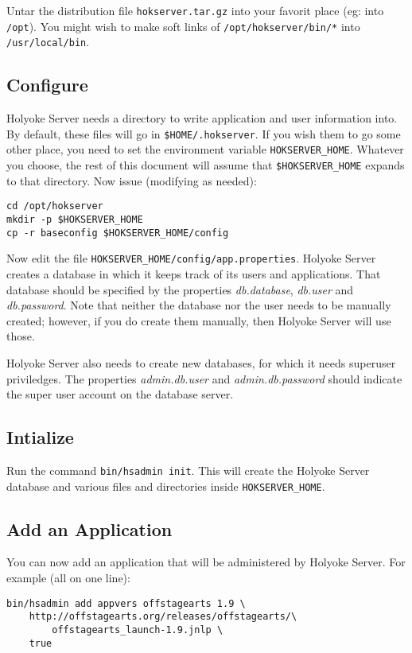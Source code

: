 \documentclass[11pt]{article}
\begin{document}
Untar the distribution file {\tt hokserver.tar.gz} into your favorit place (eg: into {\tt /opt}).  You might wish to make soft links of {\tt /opt/hokserver/bin/*} into {\tt /usr/local/bin}.

\subsection{Configure}

Holyoke Server needs a directory to write application and user information into.  By default, these files will go in {\tt \$HOME/.hokserver}.  If you wish them to go some other place, you need to set the environment variable {\tt HOKSERVER\_HOME}.  Whatever you choose, the rest of this document will assume that {\tt \$HOKSERVER\_HOME} expands to that directory.  Now issue (modifying as needed):
 \begin{verbatim}
cd /opt/hokserver
mkdir -p $HOKSERVER_HOME
cp -r baseconfig $HOKSERVER_HOME/config
 \end{verbatim}

Now edit the file {\tt HOKSERVER\_HOME/config/app.properties}.  Holyoke Server creates a database in which it keeps track of its users and applications.  That database should be specified by the properties \emph{db.database}, \emph{db.user} and \emph{db.password}.  Note that neither the database nor the user needs to be manually created; however, if you do create them manually, then Holyoke Server will use those.

Holyoke Server also needs to create new databases, for which it needs superuser priviledges.  The properties \emph{admin.db.user} and \emph{admin.db.password} should indicate the super user account on the database server.

\subsection{Intialize}

Run the command {\tt bin/hsadmin init}.  This will create the Holyoke Server database and various files and directories inside {\tt HOKSERVER\_HOME}.

\subsection{Add an Application}

You can now add an application that will be administered by Holyoke Server. For example (all on one line):
 \begin{verbatim}
bin/hsadmin add appvers offstagearts 1.9 \
    http://offstagearts.org/releases/offstagearts/\
        offstagearts_launch-1.9.jnlp \
    true
 \end{verbatim}
\end{document}
